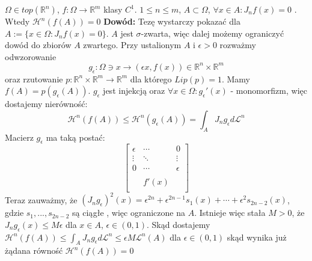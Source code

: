 \begin{lem}
	$\Omega \in top(\mathbb{R}^n)$, $f: \Omega \rightarrow \mathbb{R}^m$ klasy $C^1$. $1 \leq n \leq m$, $A \subset \Omega$, $\forall x \in A: J_nf(x) = 0$ . Wtedy $\mathcal{H}^n(f(A))=0$
	\newline\newline
	\textbf{Dowód:}\newline
	Tezę wystarczy pokazać dla $A:=\{x \in \Omega: J_nf(x)=0\}$. $A$ jest $\sigma$-zwarta, więc dalej możemy ograniczyć dowód do zbiorów $A$ zwartego. Przy ustalionym $A$ i $\epsilon > 0$ rozważmy odwzorowanie $$
		g_{\epsilon}: \Omega \ni x \rightarrow (\epsilon x, f(x)) \in \mathbb{R}^n \times \mathbb{R}^m
	$$
	oraz rzutowanie $p: \mathbb{R}^n \times \mathbb{R}^m \rightarrow \mathbb{R}^m$ dla którego $Lip(p) = 1$. Mamy $f(A) = p(g_{\epsilon}(A))$. $g_{\epsilon}$ jest injekcją oraz $\forall x \in \Omega: g_{\epsilon}'(x)$ - monomorfizm, więc  dostajemy nierówność: $$
		\mathcal{H}^n(f(A)) \leq \mathcal{H}^n(g_{\epsilon}(A)) = \int_{A} J_ng_{\epsilon} d \mathcal{L}^n
	$$ Macierz $g_{\epsilon}$ ma taką postać: $$
		\begin{bmatrix}
			\epsilon & \cdots & 0 \\
			\vdots & \ddots & \vdots \\
			0 & \cdots & \epsilon \\
			& & \\
			& f'(x) & \\
			& &
		\end{bmatrix}
	$$
	Teraz zauważmy, że $(J_ng_{\epsilon})^2(x) = \epsilon^{2n} + \epsilon^{2n-1}s_1(x) + \cdots + \epsilon^2s_{2n-2}(x)$, gdzie $s_1, ..., s_{2n-2}$ są ciągłe , więc ograniczone na $A$. Istnieje więc stała $M>0$, że $J_ng_{\epsilon}(x)\leq M\epsilon$ dla $x \in A$, $\epsilon \in (0,1)$. Skąd dostajemy $\mathcal{H}^n(f(A)) \leq \int_{A} J_ng_{\epsilon} d \mathcal{L}^n \leq \epsilon M \mathcal{L}^n(A)$ dla $\epsilon \in (0,1)$ skąd wynika już żądana równość $\mathcal{H}^n(f(A)) = 0$ 
\end{lem}